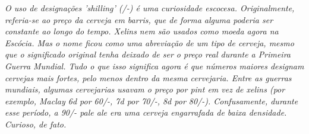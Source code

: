 \textit{O uso de designações 'shilling' (/-) é uma curiosidade escocesa. Originalmente, referia-se ao preço da cerveja em barris, que de forma alguma poderia ser constante ao longo do tempo. Xelins nem são usados como moeda agora na Escócia. Mas o nome ficou como uma abreviação de um tipo de cerveja, mesmo que o significado original tenha deixado de ser o preço real durante a Primeira Guerra Mundial. Tudo o que isso significa agora é que números maiores designam cervejas mais fortes, pelo menos dentro da mesma cervejaria. Entre as guerras mundiais, algumas cervejarias usavam o preço por pint em vez de xelins (por exemplo, Maclay 6d por 60/-, 7d por 70/-, 8d por 80/-). Confusamente, durante esse período, a 90/- pale ale era uma cerveja engarrafada de baixa densidade. Curioso, de fato.}
